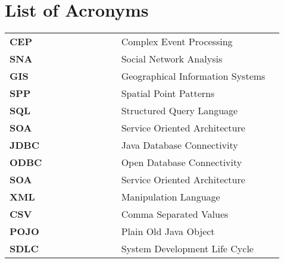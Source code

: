 \section*{List of Acronyms}

\begin{tabular}{lll}

{\bf CEP }&~~~~~~~~~~~~~~ 	        Complex Event Processing\\
{\bf SNA}&~~~~~~~~~~~~~~                Social Network Analysis\\
{\bf GIS}&~~~~~~~~~~~~~~ 		Geographical Information Systems \\
{\bf SPP}&~~~~~~~~~~~~~~                Spatial Point Patterns\\
{\bf SQL}&~~~~~~~~~~~~~~                Structured Query Language\\
{\bf SOA}&~~~~~~~~~~~~~~                Service Oriented Architecture\\
{\bf JDBC}&~~~~~~~~~~~~~~               Java Database Connectivity\\
{\bf ODBC}&~~~~~~~~~~~~~~               Open Database Connectivity\\
{\bf SOA}&~~~~~~~~~~~~~~                Service Oriented Architecture\\
{\bf XML}&~~~~~~~~~~~~~~ 		Manipulation Language\\
{\bf CSV}&~~~~~~~~~~~~~~ 		Comma Separated Values\\
{\bf POJO}&~~~~~~~~~~~~~~ 		Plain Old Java Object\\
{\bf SDLC}&~~~~~~~~~~~~~~ 	        System Development Life Cycle\\



\end{tabular}
